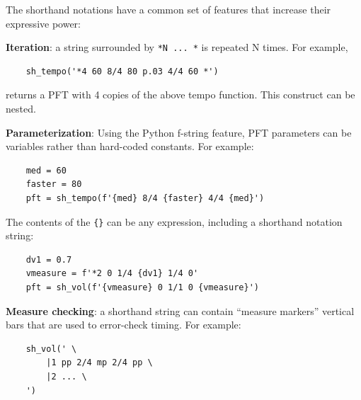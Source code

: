 \documentclass[letterpaper, 12pt]{article}
\begin{document}
The shorthand notations have a common set of features
that increase their expressive power:

\textbf{Iteration}:
a string surrounded by \texttt{*N ... *} is repeated N times.
For example,
\begin{small}\begin{singlespace}\vspace{-18px}\begin{verbatim}
    sh_tempo('*4 60 8/4 80 p.03 4/4 60 *')
\end{verbatim}\end{singlespace}\end{small}\vspace{-18px}\noindent
returns a PFT with 4 copies of the above tempo function.
This construct can be nested.

\textbf{Parameterization}: Using the Python f-string feature,
PFT parameters can be variables rather than hard-coded constants.
For example:
\begin{small}\begin{singlespace}\vspace{-18px}\begin{verbatim}
    med = 60
    faster = 80
    pft = sh_tempo(f'{med} 8/4 {faster} 4/4 {med}')
\end{verbatim}\end{singlespace}\end{small}\vspace{-18px}\noindent
The contents of the \texttt{\{\}} can be any expression,
including a shorthand notation string:
\begin{small}\begin{singlespace}\vspace{-18px}\begin{verbatim}
    dv1 = 0.7
    vmeasure = f'*2 0 1/4 {dv1} 1/4 0'
    pft = sh_vol(f'{vmeasure} 0 1/1 0 {vmeasure}')
\end{verbatim}\end{singlespace}\end{small}\vspace{-18px}\noindent

\textbf{Measure checking}:
a shorthand string can contain ``measure markers''
vertical bars that are used to error-check timing.
For example:
\begin{small}\begin{singlespace}\vspace{-18px}\begin{verbatim}
    sh_vol(' \
        |1 pp 2/4 mp 2/4 pp \
        |2 ... \
    ')
\end{verbatim}\end{singlespace}\end{small}\vspace{-18px}\noindent
\end{document}

